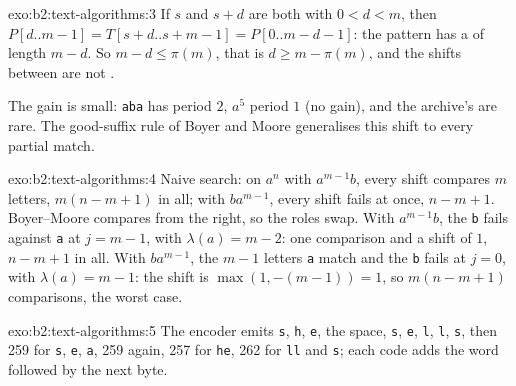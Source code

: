\begin{solution}{exo:b2:text-algorithms:3}
If $s$ and $s + d$ are both  with $0 < d < m$, then $P[d..m-1] = T[s+d..s+m-1] = P[0..m-d-1]$: the pattern
has a  of length $m - d$. So $m - d \leq \pi(m)$, that is $d \geq m - \pi(m)$, and the shifts between are not
.



The gain is small: \texttt{aba} has period $2$, $a^5$ period $1$ (no gain), and the archive's  are rare. The
good-suffix rule of Boyer and Moore generalises this shift to every partial match.
\end{solution}

\begin{solution}{exo:b2:text-algorithms:4}
Naive search: on $a^n$ with $a^{m-1}b$, every shift compares $m$ letters, $m(n - m + 1)$ in all; with $ba^{m-1}$, every
shift fails at once, $n - m + 1$. Boyer--Moore compares from the right, so the roles swap. With $a^{m-1}b$, the
\texttt{b} fails against \texttt{a} at $j = m - 1$, with $\lambda(a) = m - 2$: one comparison and a shift of $1$,
$n - m + 1$ in all. With $ba^{m-1}$, the $m - 1$ letters \texttt{a} match and the \texttt{b} fails at $j = 0$, with
$\lambda(a) = m - 1$: the shift is $\max(1, -(m-1)) = 1$, so $m(n - m + 1)$ comparisons, the worst case.
\end{solution}

\begin{solution}{exo:b2:text-algorithms:5}
The encoder emits \texttt{s}, \texttt{h}, \texttt{e}, the space, \texttt{s}, \texttt{e}, \texttt{l}, \texttt{l},
\texttt{s}, then 259 for \texttt{\textvisiblespace s}, \texttt{e}, \texttt{a}, 259 again, 257 for \texttt{he}, 262 for
\texttt{ll} and \texttt{s}; each code adds the word followed by the next byte.

\end{solution}

